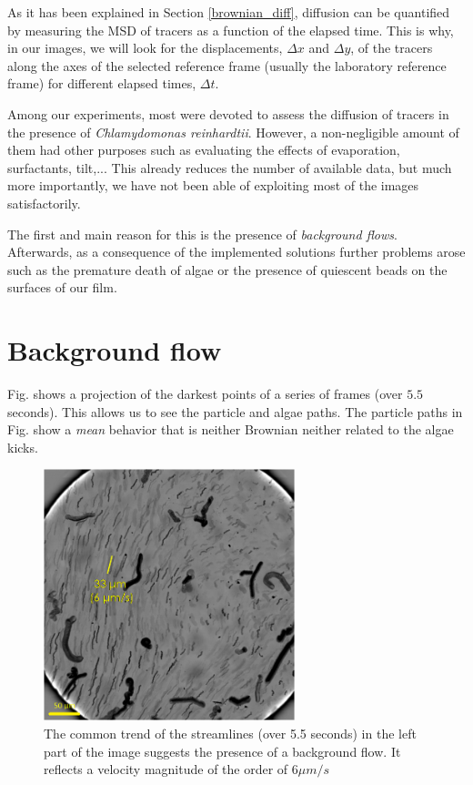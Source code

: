 As it has been explained in Section \ref{brownian_diff}, diffusion can be quantified by measuring the MSD of tracers as a function of the elapsed time. This is why, in our images, we will look for the displacements, $\Delta x$ and $\Delta y$, of the tracers along the axes of the selected reference frame (usually the laboratory reference frame) for different elapsed times, $\Delta t$.

Among our experiments, most were devoted to assess the diffusion of tracers in the presence of \textit{Chlamydomonas reinhardtii}. However, a non-negligible amount of them had other purposes such as evaluating the effects of evaporation, surfactants, tilt,... This already reduces the number of available data, but much more importantly, we have not been able of exploiting most of the images satisfactorily.

The first and main reason for this is the presence of \textit{background flows}. Afterwards, as a consequence of the implemented solutions further problems arose such as the premature death of algae or the presence of quiescent beads on the surfaces of our film.

\section{Background flow}

Fig. \label{backg_flow} shows a projection of the darkest points of a series of frames (over $5.5$ seconds). This allows us to see the particle and algae paths. The particle paths in Fig. \label{backg_flow} show a \textit{mean} behavior that is neither Brownian neither related to the algae kicks.

\begin{figure}[H]
	\centering
	\includegraphics[width=0.65\textwidth]{archivos/backg_flow.png}
	\caption{The common trend of the streamlines (over 5.5 seconds) in the left part of the image suggests the presence of a background flow. It reflects a velocity magnitude of the order of $6 \mu m / s$}
	\label{backg_flow}
\end{figure}

